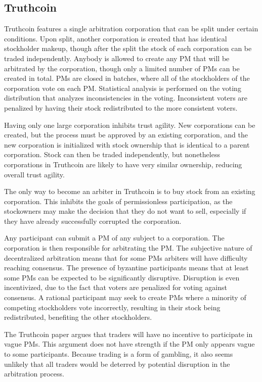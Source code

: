 \documentclass[onecolumn]{article}
\begin{document}
\subsection{Truthcoin}
Truthcoin \cite{truthcoin} features a single arbitration corporation that can be split under certain conditions.
Upon split, another corporation is created that has identical stockholder makeup, though after the split the stock of each corporation can be traded independently.
Anybody is allowed to create any PM that will be arbitrated by the corporation, though only a limited number of PMs can be created in total.
PMs are closed in batches, where all of the stockholders of the corporation vote on each PM.
Statistical analysis is performed on the voting distribution that analyzes inconsistencies in the voting.
Inconsistent voters are penalized by having their stock redistributed to the more consistent voters.

Having only one large corporation inhibits trust agility.
New corporations can be created, but the process must be approved by an existing corporation, and the new corporation is initialized with stock ownership that is identical to a parent corporation.
Stock can then be traded independently, but nonetheless corporations in Truthcoin are likely to have very similar ownership, reducing overall trust agility.

The only way to become an arbiter in Truthcoin is to buy stock from an existing corporation.
This inhibits the goals of permissionless participation, as the stockowners may make the decision that they do not want to sell, especially if they have already successfully corrupted the corporation.

Any participant can submit a PM of any subject to a corporation.
The corporation is then responsible for arbitrating the PM.
The subjective nature of decentralized arbitration means that for some PMs arbiters will have difficulty reaching consensus.
The presence of byzantine participants means that at least some PMs can be expected to be significantly disruptive.
Disruption is even incentivized, due to the fact that voters are penalized for voting against consensus.
A rational participant may seek to create PMs where a minority of competing stockholders vote incorrectly, resulting in their stock being redistributed, benefiting the other stockholders.

The Truthcoin paper argues that traders will have no incentive to participate in vague PMs.
This argument does not have strength if the PM only appears vague to some participants.
Because trading is a form of gambling, it also seems unlikely that all traders would be deterred by potential disruption in the arbitration process.
\end{document}
